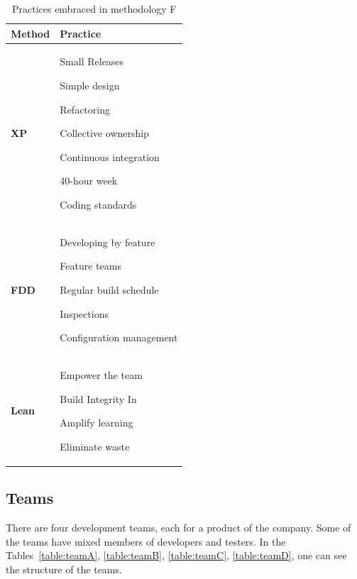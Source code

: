 \begin{table}
\caption{Practices embraced in methodology F}
\begin{tabular}{| p{2cm} | p{13cm}|}
    \hline
     \textbf{Method} & \textbf{Practice} \\ \hline
     \textbf{XP}  & \begin{inparaenum} [a\upshape)]
     				\item Small Releases \item Simple design \item Refactoring \item Collective ownership \item Continuous integration \item 40-hour week \item Coding standards
					\end{inparaenum}      \\ \hline
     \textbf{FDD}  & \begin{inparaenum} [a\upshape)]  \item Developing by feature \item Feature teams \item Regular build schedule \item Inspections \item Configuration management
     				  \end{inparaenum}\\ \hline
     \textbf{Lean} & \begin{inparaenum} [a\upshape)] \item Empower the team \item Build Integrity In \item Amplify learning \item Eliminate waste
     				 \end{inparaenum} \\ \hline
\end{tabular}
\label{table:methodologyF_practices}
\end{table}


\subsection{Teams}
There are four development teams, each for a product of the company. Some of the teams have mixed members of developers and testers. In the Tables~\ref{table:teamA}, \ref{table:teamB}, \ref{table:teamC}, \ref{table:teamD}, one can see the structure of the teams. \\

